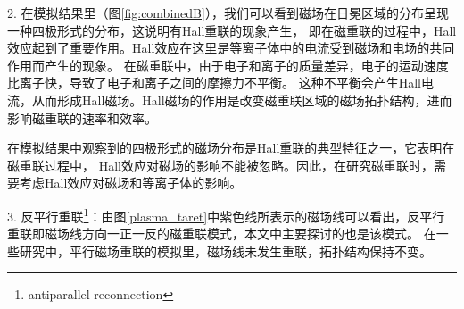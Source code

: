 2. 在模拟结果里（图\ref{fig:combinedB}），我们可以看到磁场在日冕区域的分布呈现一种四极形式的分布，这说明有Hall重联的现象产生，
即在磁重联的过程中，Hall效应起到了重要作用。Hall效应在这里是等离子体中的电流受到磁场和电场的共同作用而产生的现象。
在磁重联中，由于电子和离子的质量差异，电子的运动速度比离子快，导致了电子和离子之间的摩擦力不平衡。
这种不平衡会产生Hall电流，从而形成Hall磁场。Hall磁场的作用是改变磁重联区域的磁场拓扑结构，进而影响磁重联的速率和效率。

在模拟结果中观察到的四极形式的磁场分布是Hall重联的典型特征之一\cite{TREUMANN2006101, Zhang_2023}，它表明在磁重联过程中，
Hall效应对磁场的影响不能被忽略。因此，在研究磁重联时，需要考虑Hall效应对磁场和等离子体的影响。

3. 反平行重联\footnote{antiparallel reconnection}：由图\ref{plasma_taret}中紫色线所表示的磁场线可以看出，反平行重联即磁场线方向一正一反的磁重联模式，本文中主要探讨的也是该模式。
在一些研究中\cite{Xu2016-jj, gonzalez2016magnetic}，平行磁场重联的模拟里，磁场线未发生重联，拓扑结构保持不变。
